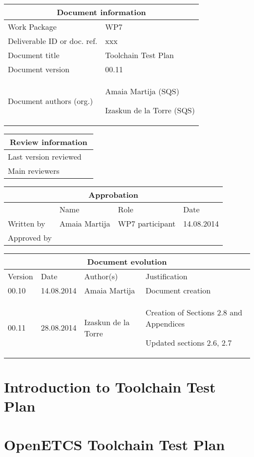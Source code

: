 \documentclass{template/openetcs_report}
\begin{document}
\begin{tabular}{|p{4.4cm}|p{8.7cm}|}
\hline
\multicolumn{2}{|c|}{Document information} \\
\hline
Work Package &  WP7  \\
Deliverable ID or doc. ref. & xxx\\
\hline
Document title & Toolchain Test Plan \\
Document version & 00.11 \\
Document authors (org.)  & Amaia Martija (SQS) 

Izaskun de la Torre (SQS)\\
\hline
\end{tabular}

\begin{tabular}{|p{4.4cm}|p{8.7cm}|}
\hline
\multicolumn{2}{|c|}{Review information} \\
\hline
Last version reviewed &  \\
\hline
Main reviewers &  \\
\hline
\end{tabular}

\begin{tabular}{|p{2.2cm}|p{4cm}|p{4cm}|p{2cm}|}
\hline
\multicolumn{4}{|c|}{Approbation} \\
\hline
  &  Name & Role & Date   \\
\hline  
Written by  &  Amaia Martija & WP7 participant & 14.08.2014 \\
\hline
Approved by &  &   &  \\
\hline
\end{tabular}

\begin{tabular}{|p{2.2cm}|p{2cm}|p{3cm}|p{5cm}|}
\hline
\multicolumn{4}{|c|}{Document evolution} \\
\hline
Version &  Date & Author(s) & Justification  \\
\hline  
00.10 & 14.08.2014 & Amaia Martija  &  Document creation  \\
\hline  
00.11 & 28.08.2014 & Izaskun de la Torre  &  Creation of Sections 2.8 and Appendices

Updated sections 2.6, 2.7  \\
\hline 
\end{tabular}
\newpage


\mainmatter







\chapter{Introduction to Toolchain Test Plan}
\label{chap:Test Plan introduction}




\chapter{OpenETCS Toolchain Test Plan}
\label{chap:test-plan}





\end{document}
